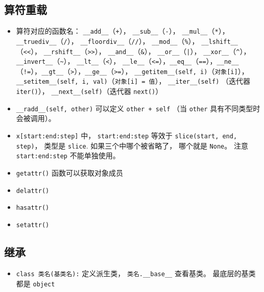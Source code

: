 \subsection{算符重载}
\begin{itemize}
\item 算符对应的函数名： \verb|__add__|（\verb|+|）， \verb|__sub__|（\verb|-|）， \verb|__mul__|（\verb|*|）， \verb|__truediv__|（\verb|/|）， \verb|__floordiv__|（\verb|//|）， \verb|__mod__|（\verb|%|）， \verb|__lshift__|（\verb|<<|）， \verb|__rshift__|（\verb|>>|）， \verb|__and__|（\verb|&|）， \verb|__or__|（\verb`|`）， \verb|__xor__|（\verb|^|）， \verb|__invert__|（\verb|~|）， \verb|__lt__|（\verb|<|）， \verb|__le__|（\verb|<=|），\verb|__eq__|（\verb|==|），\verb|__ne__|（\verb|!=|），\verb|__gt__|（\verb|>|），\verb|__ge__|（\verb|>=|）， \verb|__getitem__(self, i)|（\verb|对象[i]|）， \verb|__setitem__(self, i, val)|（\verb|对象[i] = 值|）， \verb|__iter__(self)| （迭代器 \verb|iter()|）， \verb|__next__(self)|（迭代器 \verb|next()|）
\item \verb|__radd__(self, other)| 可以定义 \verb|other + self| （当 \verb|other| 具有不同类型时会被调用）。
\item \verb|x[start:end:step]| 中， \verb|start:end:step| 等效于 \verb|slice(start, end, step)|， 类型是 \verb|slice|. 如果三个中哪个被省略了， 哪个就是 \verb|None|。 注意 \verb|start:end:step| 不能单独使用。
\item \verb|getattr()| 函数可以获取对象成员
\item  \verb|delattr()|
\item \verb|hasattr()|
\item \verb|setattr()| 
\end{itemize}

\subsection{继承}
\begin{itemize}
\item \verb|class 类名(基类名):| 定义派生类， \verb|类名.__base__| 查看基类。 最底层的基类都是 \verb|object|
\end{itemize}
